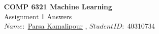 \documentclass[10pt,letter,notitlepage]{article}
\newcommand{\red}[1]{{\color{red}#1}}
\newcounter{exercise}
\begin{document}
\begin{center}
  \large{\textbf{COMP 6321 Machine Learning} \\ Assignment 1 Answers} \\


$Name:$ \href{https://benymaxparsa.github.io}{Parsa Kamalipour} \; , \; $Student ID:$ 40310734

\end{center}
%    
%
%
\end{document}
